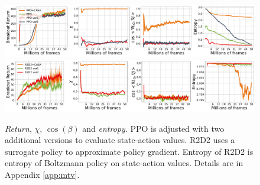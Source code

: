 \begin{figure}[t!]
	\centering
	\begin{minipage}[c]{0.75\textwidth}
\includegraphics[width=\linewidth]{body/intro_fig/new_mtv_Breakout.pdf}
\includegraphics[width=\linewidth]{body/intro_fig/new_r2d2_mtv_Breakout.pdf}
  \end{minipage} \hfill
  \begin{minipage}[c]{0.23\textwidth}
    \caption{
    \small
    \emph{Return}, $\chi$, $\cos(\beta)$ and \emph{entropy}. PPO is adjusted with two additional versions to evaluate state-action values. R2D2 uses a surrogate policy to approximate policy gradient. Entropy of R2D2 is entropy of Boltzmann policy on state-action values. 
    Details are in Appendix \ref{app:mtv}.}
    \label{fig:mtv}
    \end{minipage}
\end{figure}

